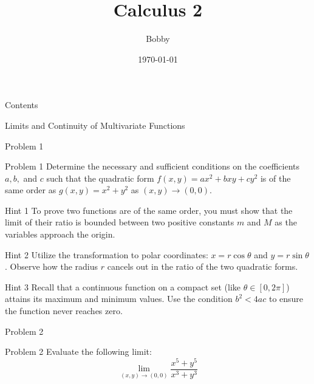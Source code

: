 \documentclass{beamer}
\title{Calculus 2}
\author{Bobby}
\institute{IIIS, Tsinghua University}
\date{\today}
\begin{document}
\begin{frame}
    \titlepage
\end{frame}

\begin{frame}{Contents}
    \tableofcontents[hideallsubsections]
\end{frame}

\begin{section}{Limits and Continuity of Multivariate Functions}

\begin{subsection}{Problem 1}
    \begin{frame}
        \begin{block}{Problem 1}
            Determine the necessary and sufficient conditions on the coefficients $a, b,$ and $c$ such that the quadratic form $f(x, y) = ax^2 + bxy + cy^2$ is of the same order as $g(x, y) = x^2 + y^2$ as $(x, y) \to (0, 0)$.    
        \end{block}
    \end{frame}

    \begin{frame}
        \begin{block}{Hint 1}
            To prove two functions are of the same order, you must show that the limit of their ratio is bounded between two positive constants $m$ and $M$ as the variables approach the origin.
        \end{block}

        \pause
        \vspace{2em}
        \begin{block}{Hint 2}
            Utilize the transformation to polar coordinates: $x = r \cos \theta$ and $y = r \sin \theta$. Observe how the radius $r$ cancels out in the ratio of the two quadratic forms.
        \end{block}

    \end{frame}

    \begin{frame}
        \begin{block}{Hint 3}
            Recall that a continuous function on a compact set (like $\theta \in [0, 2\pi]$) attains its maximum and minimum values. Use the condition $b^2 < 4ac$ to ensure the function never reaches zero.
        \end{block}
    \end{frame}
\end{subsection}

\begin{subsection}{Problem 2}
    \begin{frame}
        \begin{block}{Problem 2}
            Evaluate the following limit:
            \[
            \lim_{(x,y) \to (0,0)} \frac{x^5 + y^5}{x^3 + y^3}
            \]    
        \end{block}
    \end{frame}


\end{subsection}
\end{section}
\end{document}
